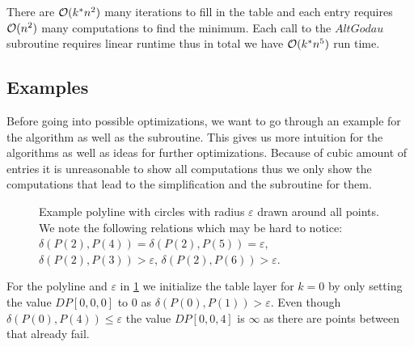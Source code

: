 There are \(\mathcal{O}(k^* n^2)\) many iterations to fill in the table and each entry requires \(\mathcal{O}(n^2)\) many computations to find the minimum. Each call to the \(AltGodau\) subroutine requires linear runtime thus in total we have \(\mathcal{O}(k^*n^5)\) run time.

\subsection{Examples}
Before going into possible optimizations, we want to go through an example for the algorithm as well as the \citeauthor{computing_the_frechet_distance_between_two_polygonal_curves} subroutine. This gives us more intuition for the algorithms as well as ideas for further optimizations. Because of cubic amount of entries it is unreasonable to show all computations thus we only show the computations that lead to the simplification and the subroutine for them. 

\begin{figure}
  \centering
  \caption{Example polyline with circles with radius \(\varepsilon\) drawn around all points. We note the following relations which may be hard to notice: \(\delta(P(2), P(4)) = \delta(P(2), P(5)) = \varepsilon\), \(\delta(P(2), P(3)) > \varepsilon\), \(\delta(P(2), P(6)) > \varepsilon\).}
  \label{fig:poly-ex-main}
\end{figure}

For the polyline and \(\varepsilon\) in \cref{fig:poly-ex-main} we initialize the table layer for \(k = 0\) by only setting the value \(DP[0,0,0]\) to \(0\) as \(\delta(P(0), P(1)) > \varepsilon\). Even though \(\delta(P(0), P(4)) \leq \varepsilon\) the value \(DP[0,0,4]\) is \(\infty\) as there are points between that already fail.

